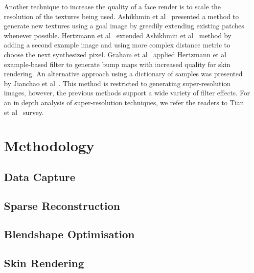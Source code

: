 \documentclass[11pt]{report}
\begin{document}
Another technique to increase the quality of a face render is to scale the resolution of the textures being used.
Ashikhmin et al~\cite{Ashikhmin2001} presented a method to generate new textures using a goal image by greedily extending existing patches whenever possible.
Hertzmann et al~\cite{Hertzmann2001} extended Ashikhmin et al~\cite{Ashikhmin2001} method by adding a second example image and using more complex distance metric to choose the next synthesized pixel.
Graham et al~\cite{Graham2013} applied Hertzmann et al~\cite{Hertzmann2001} example-based filter to generate bump maps with increased quality for skin rendering.
An alternative approach using a dictionary of samples was presented by Jianchao et al~\cite{Jianchao2010}.
This method is restricted to generating super-resolution images, however, the previous methods support a wide variety of filter effects.
For an in depth analysis of super-resolution techniques, we refer the readers to Tian et al~\cite{Tian2011} survey.




\chapter{Methodology}
\label{sec:methods}


\section{Data Capture}


\section{Sparse Reconstruction}


\section{Blendshape Optimisation}


\section{Skin Rendering}
\end{document}
